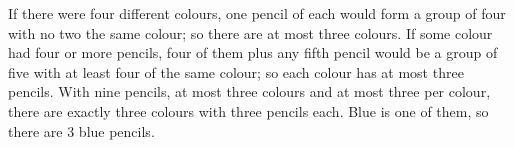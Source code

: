 If there were four different colours, one pencil of each would form a group of four with no two the same colour; so there are at most three colours. If some colour had four or more pencils, four of them plus any fifth pencil would be a group of five with at least four of the same colour; so each colour has at most three pencils. With nine pencils, at most three colours and at most three per colour, there are exactly three colours with three pencils each. Blue is one of them, so there are $\boxed{3}$ blue pencils.
